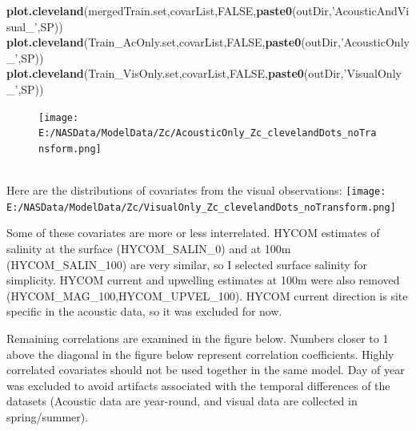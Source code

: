 \documentclass[11pt,]{article}
\newenvironment{Shaded}{\begin{snugshade}}{\end{snugshade}}
\newcommand{\KeywordTok}[1]{\textcolor[rgb]{0.13,0.29,0.53}{\textbf{{#1}}}}
\newcommand{\StringTok}[1]{\textcolor[rgb]{0.31,0.60,0.02}{{#1}}}
\newcommand{\OtherTok}[1]{\textcolor[rgb]{0.56,0.35,0.01}{{#1}}}
\newcommand{\NormalTok}[1]{{#1}}
\begin{document}
\begin{Shaded}
\begin{Highlighting}[]
\KeywordTok{plot.cleveland}\NormalTok{(mergedTrain.set,covarList,}\OtherTok{FALSE}\NormalTok{,}\KeywordTok{paste0}\NormalTok{(outDir,}\StringTok{'AcousticAndVisual_'}\NormalTok{,SP))}
\KeywordTok{plot.cleveland}\NormalTok{(Train_AcOnly.set,covarList,}\OtherTok{FALSE}\NormalTok{,}\KeywordTok{paste0}\NormalTok{(outDir,}\StringTok{'AcousticOnly_'}\NormalTok{,SP))}
\KeywordTok{plot.cleveland}\NormalTok{(Train_VisOnly.set,covarList,}\OtherTok{FALSE}\NormalTok{,}\KeywordTok{paste0}\NormalTok{(outDir,}\StringTok{'VisualOnly_'}\NormalTok{,SP))}
\end{Highlighting}
\end{Shaded}

\begin{figure}[htbp]
\centering
\texttt{[image: E:/NASData/ModelData/Zc/AcousticOnly\_Zc\_clevelandDots\_noTransform.png]}
\caption{}
\end{figure}

\\

Here are the distributions of covariates from the visual observations:
\texttt{[image: E:/NASData/ModelData/Zc/VisualOnly\_Zc\_clevelandDots\_noTransform.png]}

Some of these covariates are more or less interrelated. HYCOM estimates
of salinity at the surface (HYCOM\_SALIN\_0) and at 100m
(HYCOM\_SALIN\_100) are very similar, so I selected surface salinity for
simplicity. HYCOM current and upwelling estimates at 100m were also
removed (HYCOM\_MAG\_100,HYCOM\_UPVEL\_100). HYCOM current direction is
site specific in the acoustic data, so it was excluded for now.

Remaining correlations are examined in the figure below. Numbers closer
to 1 above the diagonal in the figure below represent correlation
coefficients. Highly correlated covariates should not be used together
in the same model. Day of year was excluded to avoid artifacts
associated with the temporal differences of the datasets (Acoustic data
are year-round, and visual data are collected in spring/summer).
\end{document}
